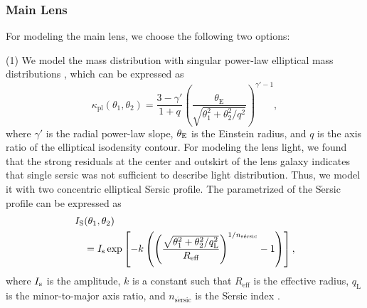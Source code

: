 \documentclass[useAMS,usenatbib]{mnras}
\begin{document}
\subsubsection{Main Lens}
For modeling the main lens, we choose the following two options:

(1) We model the mass distribution with singular power-law elliptical mass distributions \citep[hereafter SPEMD,][]{Barkana98}, which can be expressed as 
\begin{equation}
\label{eq:arclight-1}
\kappa_{\text{pl}}(\theta_{1},\theta_{2})=\frac{3-\gamma'}{1+q}\left( \frac{\theta_{\text{E}}}{\sqrt{\theta_{1}^{2}+\theta_{2}^{2}/q^2}}   \right)^{\gamma'-1},
\end{equation}
where $\gamma'$ is the radial power-law slope, $\theta_{\rm E}$ is the Einstein radius, and
$q$ is the axis ratio of the elliptical isodensity contour. For modeling the lens light, we found that the strong residuals at the center and outskirt of the lens galaxy indicates that single sersic was not sufficient to describe light distribution. Thus, we model it with two concentric elliptical S$\acute{\text{e}}$rsic profile. The parametrized of the S$\acute{\text{e}}$rsic profile can be expressed as
\begin{equation}\label{eq:sersic}
\begin{split}
I_{\rm S}&(\theta_{1},\theta_{2}) \\
&=I_{\rm s}\,\mathrm{exp}\left[-k\left(\left(\frac{\sqrt{\theta_{1}^{2}+\theta_{2}^{2}/q_{\text{L}}^{2}}}{R_{\text{eff}}}\right)^{1/n_{\text{s}\acute{\text{e}}\text{rsic}}}-1\right)\right],
\end{split}
\end{equation}
where $I_{\rm s}$ is the amplitude, $k$ is a constant such that
$R_{\text{eff}}$ is the effective radius, $q_{\text{L}}$ is the minor-to-major axis ratio, and $n_{\text{s}\acute{\text{e}}\text{rsic}}$ is the
S$\acute{\text{e}}$rsic index \citep{Sersic68}.
\end{document}
